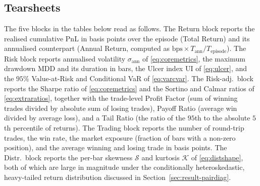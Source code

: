 \subsection{Tearsheets}\label{sec:apx-tearsheets}

The five blocks in the tables below read as follows. The Return block reports the realised cumulative PnL in basis points over the episode (Total Return) and its annualised counterpart (Annual Return, computed as $\text{bps}\times T_{\text{ann}}/T_{\text{episode}}$). The Risk block reports annualised volatility $\sigma_{\mathrm{ann}}$ of \eqref{eq:coremetrics}, the maximum drawdown $\mathrm{MDD}$ and its duration in bars, the Ulcer index $\mathrm{UI}$ of \eqref{eq:ulcer}, and the $95\%$ Value-at-Risk and Conditional VaR of \eqref{eq:varcvar}. The Risk-adj.\ block reports the Sharpe ratio of \eqref{eq:coremetrics} and the Sortino and Calmar ratios of \eqref{eq:extraratios}, together with the trade-level Profit Factor (sum of winning trades divided by absolute sum of losing trades), Payoff Ratio (average win divided by average loss), and a Tail Ratio (the ratio of the $95$th to the absolute $5$th percentile of returns). The Trading block reports the number of round-trip trades, the win rate, the market exposure (fraction of bars with a non-zero position), and the average winning and losing trade in basis points. The Distr.\ block reports the per-bar skewness $\mathcal{S}$ and kurtosis $\mathcal{K}$ of \eqref{eq:distshape}, both of which are large in magnitude under the conditionally heteroskedastic, heavy-tailed return distribution discussed in Section~\ref{sec:result-pairdiag}.


